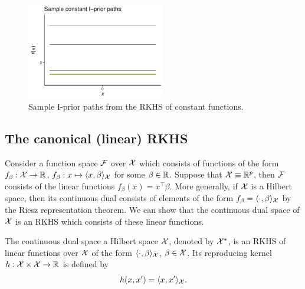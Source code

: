 \begin{figure}[hbt]
  \centering
  \includegraphics[width=0.54\textwidth]{figure/02-kernel_path_const}
  \caption{Sample I-prior paths from the RKHS of constant functions.}
\end{figure}

\subsection{The canonical (linear) RKHS}

Consider a function space ${\mathcal F}$ over ${\mathcal X}$ which consists of functions of the form $f_\beta:{\mathcal X}\to\mathbb{R}$, $f_\beta: x \mapsto \langle x,\beta\rangle_{\mathcal X}$ for some $\beta\in\mathbb{R}$.
Suppose that ${\mathcal X} \equiv \mathbb{R}^p$, then ${\mathcal F}$ consists of the linear functions $f_\beta(x) = x^\top\beta$.
More generally, if ${\mathcal X}$ is a Hilbert space, then its continuous dual consists of elements of the form $f_\beta = \langle\cdot,\beta\rangle_{\mathcal X}$ by the Riesz representation theorem.
We can show that the continuous dual space of ${\mathcal X}$ is an RKHS which consists of these linear functions.

\begin{proposition}
  The continuous dual space a Hilbert space ${\mathcal X}$, denoted by ${\mathcal X}^*$, is an RKHS of linear functions over ${\mathcal X}$ of the form $\langle\cdot,\beta\rangle_{\mathcal X}$, $\beta\in{\mathcal X}$. Its reproducing kernel $h:{\mathcal X}\times{\mathcal X}\to\mathbb{R}$ is defined by
  \[
    h(x,x') = \langle x,x'\rangle_{{\mathcal X}}.
  \]
\end{proposition}

